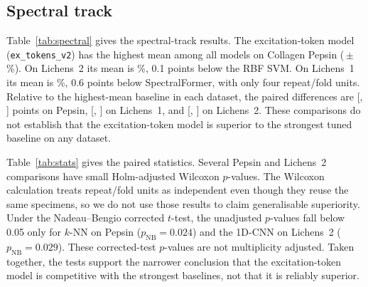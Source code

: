 \documentclass[journal]{IEEEtran}
\begin{document}
\subsection{Spectral track}
\begin{table}[!t]
\centering
\caption{Spectral track: balanced accuracy (\%), mean $\pm$ std over (repeat, fold) units. Best per column in bold, second best underlined. Models below the rule are our attention family (ex tokens v2: excitation tokens; ME-Attn (meas.): measurement tokens; SmartAttn v0: reference prototype). The $\Delta$ row compares the highest-mean proposed variant with the highest-mean baseline on the same outer-test units. Both are identified post hoc, so this row is descriptive.}
\label{tab:spectral}

\end{table}

Table~\ref{tab:spectral} gives the spectral-track results. The excitation-token model (\texttt{ex\_tokens\_v2}) has the highest mean among all models on Collagen Pepsin (\BestOursAccPepsinSpectral\,$\pm$\,\BestOursStdPepsinSpectral\%). On Lichens~2 its mean is \BestOursAccLichensTwoSpectral\%, 0.1 points below the RBF SVM. On Lichens~1 its mean is \BestOursAccLichensOneSpectral\%, 0.6 points below SpectralFormer, with only four repeat/fold units. Relative to the highest-mean baseline in each dataset, the paired differences are \GapPepsinSpectral{} [\GapLoPepsinSpectral, \GapHiPepsinSpectral] points on Pepsin, \GapLichensOneSpectral{} [\GapLoLichensOneSpectral, \GapHiLichensOneSpectral] on Lichens~1, and \GapLichensTwoSpectral{} [\GapLoLichensTwoSpectral, \GapHiLichensTwoSpectral] on Lichens~2. These comparisons do not establish that the excitation-token model is superior to the strongest tuned baseline on any dataset.

Table~\ref{tab:stats} gives the paired statistics. Several Pepsin and Lichens~2 comparisons have small Holm-adjusted Wilcoxon $p$-values. The Wilcoxon calculation treats repeat/fold units as independent even though they reuse the same specimens, so we do not use those results to claim generalisable superiority. Under the Nadeau--Bengio corrected $t$-test, the unadjusted $p$-values fall below 0.05 only for $k$-NN on Pepsin ($p_{\mathrm{NB}}=0.024$) and the 1D-CNN on Lichens~2 ($p_{\mathrm{NB}}=0.029$). These corrected-test $p$-values are not multiplicity adjusted. Taken together, the tests support the narrower conclusion that the excitation-token model is competitive with the strongest baselines, not that it is reliably superior.
\end{document}
